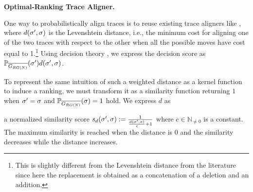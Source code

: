 \vspace{+0.2cm}
\noindent
\textbf{Optimal-Ranking Trace Aligner.}\label{subsec:eta}
{One way to probabilistically align traces is to reuse existing trace aligners like \cite{LeoniM17}, where $d({\sigma'},\sigma)$
is the Levenshtein distance, i.e., the {minimum} cost for aligning one of the two traces with respect to the other when all the possible moves have cost equal to 1.\footnote{This is slightly different from the Levenshtein distance from the literature since here the replacement is obtained as a concatenation of a deletion and an addition.} Using decision theory \cite{dectheor}, we express the decision score as  $\mathbb{P}_{\overline{G_{RG(N)}}}({\sigma'}) d({\sigma'},\sigma)$.

To represent the same intuition of such a weighted distance as a kernel function to induce a ranking, we must transform it as a
similarity function returning $1$ when ${\sigma'}=\sigma$ and  $\mathbb{P}_{\overline{G_{RG(N)}}}(\sigma)=1$ hold. We express $d$ as}
a normalized similarity score $s_d({\sigma'},\sigma):=\frac{1}{\frac{d({\sigma'},\sigma)}{c}+1}$ where $c\in\mathbb{N}_{\neq 0}$ is a constant. The maximum similarity is reached when the distance is $0$ and the similarity decreases while the distance increases. %
